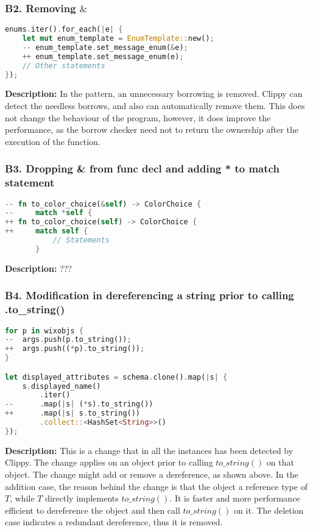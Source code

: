 \subsubsection{B2. Removing $\&$}


\begin{lstlisting}[language=Rust, style=colouredRust, label={l3}]
enums.iter().for_each(|e| {
    let mut enum_template = EnumTemplate::new();
    -- enum_template.set_message_enum(&e);
    ++ enum_template.set_message_enum(e);
    // Other statements
});
\end{lstlisting}

\noindent \textbf{Description:} In the pattern, an unnecessary borrowing is removed. Clippy can detect the needless borrows, and also can automatically remove them. This does not change the behaviour of the program, however, it does improve the performance, as the borrow checker need not to return the ownership after the execution of the function.

\subsubsection{B3. Dropping & from func decl and adding * to match statement}

\begin{lstlisting}[language=Rust, style=colouredRust, label={l3}]
-- fn to_color_choice(&self) -> ColorChoice {
--     match *self {
++ fn to_color_choice(self) -> ColorChoice {
++     match self {
           // Statements
       }
\end{lstlisting}

\noindent \textbf{Description:} ???


\subsubsection{B4. Modification in dereferencing a string prior to calling .to_string()}

\begin{lstlisting}[language=Rust, style=colouredRust, label={l3}]
for p in wixobjs {
--  args.push(p.to_string());
++  args.push((*p).to_string());
}

let displayed_attributes = schema.clone().map(|s| {
    s.displayed_name()
        .iter()
--      .map(|s| (*s).to_string())
++      .map(|s| s.to_string())
        .collect::<HashSet<String>>()
});
\end{lstlisting}

\noindent \textbf{Description:} This is a change that in all the instances has been detected by Clippy. The change applies on an object prior to calling $to\_string()$ on that object. The change might add or remove a dereference, as shown above. In the addition case, the reason behind the change is that the object a reference type of $T$, while $T$ directly implements $to\_string()$. It is faster and more performance efficient to dereference the object and then call $to\_string()$ on it. The deletion case indicates a redundant dereference, thus it is removed.


